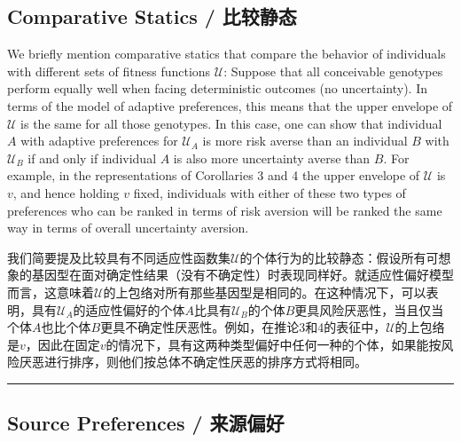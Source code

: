 \documentclass[12pt,a4paper]{article}
\newenvironment{original}
  {\par\noindent\color{black}\smallskip}
  {\par\smallskip}
\newenvironment{translation}
  {\par\noindent\color{blue!70!black}\smallskip}
  {\par\medskip\hrule\medskip}
\begin{document}
\subsection{Comparative Statics / 比较静态}

\begin{original}
We briefly mention comparative statics that compare the behavior of individuals with different sets of fitness functions $\mathcal{U}$: Suppose that all conceivable genotypes perform equally well when facing deterministic outcomes (no uncertainty). In terms of the model of adaptive preferences, this means that the upper envelope of $\mathcal{U}$ is the same for all those genotypes. In this case, one can show that individual $A$ with adaptive preferences for $\mathcal{U}_A$ is more risk averse than an individual $B$ with $\mathcal{U}_B$ if and only if individual $A$ is also more uncertainty averse than $B$. For example, in the representations of Corollaries 3 and 4 the upper envelope of $\mathcal{U}$ is $v$, and hence holding $v$ fixed, individuals with either of these two types of preferences who can be ranked in terms of risk aversion will be ranked the same way in terms of overall uncertainty aversion.
\end{original}
\begin{translation}
我们简要提及比较具有不同适应性函数集$\mathcal{U}$的个体行为的比较静态：假设所有可想象的基因型在面对确定性结果（没有不确定性）时表现同样好。就适应性偏好模型而言，这意味着$\mathcal{U}$的上包络对所有那些基因型是相同的。在这种情况下，可以表明，具有$\mathcal{U}_A$的适应性偏好的个体$A$比具有$\mathcal{U}_B$的个体$B$更具风险厌恶性，当且仅当个体$A$也比个体$B$更具不确定性厌恶性。例如，在推论3和4的表征中，$\mathcal{U}$的上包络是$v$，因此在固定$v$的情况下，具有这两种类型偏好中任何一种的个体，如果能按风险厌恶进行排序，则他们按总体不确定性厌恶的排序方式将相同。
\end{translation}

\subsection{Source Preferences / 来源偏好}
\end{document}
